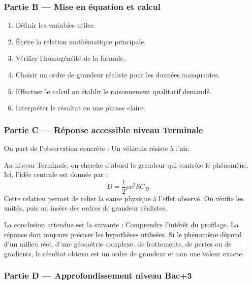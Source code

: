 \documentclass[11pt,a4paper]{article}
\begin{document}
\subsubsection*{Partie B — Mise en équation et calcul}

\begin{enumerate}
  \item Définir les variables utiles.
  \item Écrire la relation mathématique principale.
  \item Vérifier l'homogénéité de la formule.
  \item Choisir un ordre de grandeur réaliste pour les données manquantes.
  \item Effectuer le calcul ou établir le raisonnement qualitatif demandé.
  \item Interpréter le résultat en une phrase claire.
\end{enumerate}

\subsubsection*{Partie C — Réponse accessible niveau Terminale}

\begin{corrigebox}
On part de l'observation concrète : Un véhicule résiste à l'air.

Au niveau Terminale, on cherche d'abord la grandeur qui contrôle le phénomène. Ici, l'idée centrale est donnée par :
\[
D=\frac12\rho v^2SC_D
\]
Cette relation permet de relier la cause physique à l'effet observé. On vérifie les unités, puis on insère des ordres de grandeur réalistes.

La conclusion attendue est la suivante : Comprendre l'intérêt du profilage. La réponse doit toujours préciser les hypothèses utilisées. Si le phénomène dépend d'un milieu réel, d'une géométrie complexe, de frottements, de pertes ou de gradients, le résultat obtenu est un ordre de grandeur et non une valeur exacte.
\end{corrigebox}

\subsubsection*{Partie D — Approfondissement niveau Bac+3}
\end{document}
